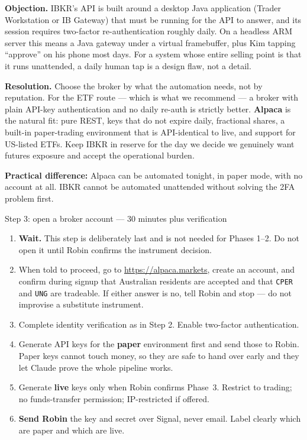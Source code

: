 \documentclass[11pt,a4paper]{article}
\begin{document}
\textbf{Objection.} IBKR's API is built around a desktop Java
application (Trader Workstation or IB Gateway) that must be running for
the API to answer, and its session requires two-factor
re-authentication roughly daily. On a headless ARM server this means a
Java gateway under a virtual framebuffer, plus Kim tapping ``approve''
on his phone most days. For a system whose entire selling point is that
it runs unattended, a daily human tap is a design flaw, not a detail.

\textbf{Resolution.} Choose the broker by what the automation needs,
not by reputation. For the ETF route --- which is what we recommend
--- a broker with plain API-key authentication and no daily re-auth is
strictly better. \textbf{Alpaca} is the natural fit: pure REST, keys
that do not expire daily, fractional shares, a built-in paper-trading
environment that is API-identical to live, and support for
US-listed ETFs. Keep IBKR in reserve for the day we decide we
genuinely want futures exposure and accept the operational burden.

\textbf{Practical difference:} Alpaca can be automated tonight, in
paper mode, with no account at all. IBKR cannot be automated unattended
without solving the 2FA problem first.

\begin{kimbox}{Step 3: open a broker account --- 30 minutes plus verification}
\begin{enumerate}[leftmargin=1.6em, itemsep=3pt]
    \item \textbf{Wait.} This step is deliberately last and is not
          needed for Phases 1--2. Do not open it until Robin confirms
          the instrument decision.
    \item When told to proceed, go to \url{https://alpaca.markets},
          create an account, and confirm during signup that Australian
          residents are accepted and that \texttt{CPER} and
          \texttt{UNG} are tradeable. If either answer is no, tell
          Robin and stop --- do not improvise a substitute instrument.
    \item Complete identity verification as in Step 2. Enable
          two-factor authentication.
    \item Generate API keys for the \textbf{paper} environment first
          and send those to Robin. Paper keys cannot touch money, so
          they are safe to hand over early and they let Claude prove
          the whole pipeline works.
    \item Generate \textbf{live} keys only when Robin confirms
          Phase~3. Restrict to trading; no funds-transfer permission;
          IP-restricted if offered.
    \item \textbf{Send Robin} the key and secret over Signal, never
          email. Label clearly which are paper and which are live.
\end{enumerate}
\end{kimbox}
\end{document}

